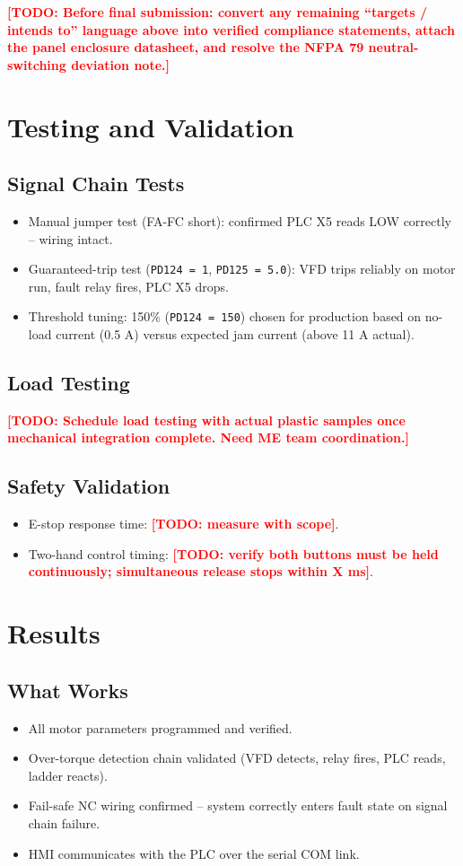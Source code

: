 \documentclass[hidelinks,12pt]{article}
\newcommand{\todo}[1]{\textcolor{red}{\textbf{[TODO: #1]}}}
\begin{document}
\todo{Before final submission: convert any remaining ``targets / intends to'' language
above into verified compliance statements, attach the panel enclosure datasheet, and
resolve the NFPA 79 neutral-switching deviation note.}

\section{Testing and Validation}

\subsection{Signal Chain Tests}
\begin{itemize}
    \item Manual jumper test (FA-FC short): confirmed PLC X5 reads LOW correctly -- wiring intact.
    \item Guaranteed-trip test (\texttt{PD124 = 1}, \texttt{PD125 = 5.0}): VFD trips reliably on motor run, fault relay fires, PLC X5 drops.
    \item Threshold tuning: 150\% (\texttt{PD124 = 150}) chosen for production based on no-load current (0.5 A) versus expected jam current (above 11 A actual).
\end{itemize}

\subsection{Load Testing}
\todo{Schedule load testing with actual plastic samples once mechanical integration complete. Need ME team coordination.}

\subsection{Safety Validation}
\begin{itemize}
    \item E-stop response time: \todo{measure with scope}.
    \item Two-hand control timing: \todo{verify both buttons must be held continuously; simultaneous release stops within X ms}.
\end{itemize}

\section{Results}

\subsection{What Works}
\begin{itemize}
    \item All motor parameters programmed and verified.
    \item Over-torque detection chain validated (VFD detects, relay fires, PLC reads, ladder reacts).
    \item Fail-safe NC wiring confirmed -- system correctly enters fault state on signal chain failure.
    \item HMI communicates with the PLC over the serial COM link.
\end{itemize}
\end{document}
